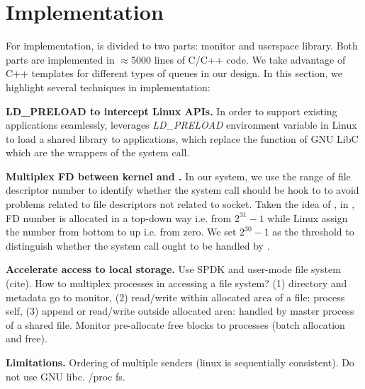 \section{Implementation}
\label{sec:implementation}

For implementation, \libipc is divided to two parts: monitor and userspace library. Both parts are implemented in $\approx$5000 lines of C/C++ code. We take advantage of C++ templates for different types of queues in our design. %
In this section, we highlight several techniques in implementation:


\textbf{LD\_PRELOAD to intercept Linux APIs.}
In order to support existing applications seamlessly, \libipc leverages \textit{LD\_PRELOAD} environment variable in Linux to load a shared library to applications, which replace the function of GNU LibC which are the wrappers of the system call. 

\textbf{Multiplex FD between kernel and \libipc{}.}
In our system, we use the range of file descriptor number to identify whether the system call should be hook to \libipc to avoid problems related to file descriptors not related to socket. Taken the idea of \cite{huang2017high}, in \libipc, FD number is allocated in a top-down way i.e. from $2^{31}-1$ while Linux assign the number from bottom to up i.e. from zero. We set $2^{30} - 1 $ as the threshold to distinguish whether the system call ought to be handled by \libipc.



\textbf{Accelerate access to local storage.}
Use SPDK and user-mode file system (cite). How to multiplex processes in accessing a file system? (1) directory and metadata go to monitor, (2) read/write within allocated area of a file: process self, (3) append or read/write outside allocated area: handled by master process of a shared file. Monitor pre-allocate free blocks to processes (batch allocation and free).

\textbf{Limitations.}
Ordering of multiple senders (linux is sequentially consistent). Do not use GNU libc. /proc fs.